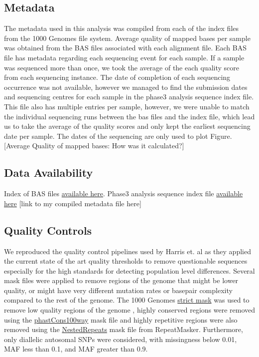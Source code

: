 \documentclass[12pt]{amsart}
\begin{document}
\subsection{Metadata}
The metadata used in this analysis was compiled from each of the index files from the 1000 Genomes file system. 
Average quality of mapped bases per sample was obtained from the BAS files associated with each alignment file. 
Each BAS file has metadata regarding each sequencing event for each sample. 
If a sample was sequenced more than once, we took the average of the each quality score from each sequencing instance. 
The date of completion of each sequencing occurrence was not available, however we managed to find the submission dates and sequencing centres for each sample in the phase3 analysis sequence index file.  
This file also has multiple entries per sample, however, we were unable to match the individual sequencing runs between the bas files and the index file, which lead us to take the average of the quality scores and only kept the earliest sequencing date per sample. 
The dates of the sequencing are only used to plot Figure. [Average Quality of mapped bases: How was it calculated?]

\subsection{Data Availability}

Index of BAS files \href{http://ftp.1000genomes.ebi.ac.uk/vol1/ftp/data_collections/1000_genomes_project/1000genomes.low_coverage.GRCh38DH.alignment.index}{available here}.
Phase3 analysis sequence index file  \href{http://ftp.1000genomes.ebi.ac.uk/vol1/ftp/phase3/20130502.phase3.analysis.sequence.index}{available here} 
[link to my compiled metadata file here]

\subsection{Quality Controls}
We reproduced the quality control pipelines used by Harris et. al as they applied the current state of the art quality thresholds to remove questionable sequences especially for the high standards for detecting population level differences. 
Several mask files were applied to remove regions of the genome that might be lower quality, or might have very different mutation rates or basepair complexity compared to the rest of the genome. 
The  1000 Genomes \href{http://ftp.1000genomes.ebi.ac.uk/vol1/ftp/release/20130502/supporting/accessible_genome_masks/20141020.strict_mask.whole_genome.bed}{strict mask} was used to remove low quality regions of the genome , highly conserved regions were removed using the \href{http://hgdownload.cse.ucsc.edu/goldenPath/hg19/database/phastConsElements100way.txt.gz}{phastCons100way} mask file and highly repetitive regions were also removed using the \href{http://hgdownload.cse.ucsc.edu/goldenpath/hg19/database/nestedRepeats.txt.gz}{NestedRepeats} mask file from RepeatMasker. 
Furthermore, only diallelic autosomal SNPs were considered, with missingness below 0.01, MAF less than 0.1, and MAF greater than 0.9.
\end{document}
